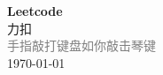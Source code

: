 \vspace*{\fill}
\begin{center}
    \textcolor{orange!50}{\Huge\textbf{Leetcode}} \\[1em]
    \textcolor{orange!60!pink}{\Large 力扣} \\[2em]
    \textcolor{gray}{\large 手指敲打键盘如你敲击琴键} \\[1em]
    \today
\end{center}
\vspace*{\fill}
\clearpage


\clearpage

\clearpage





